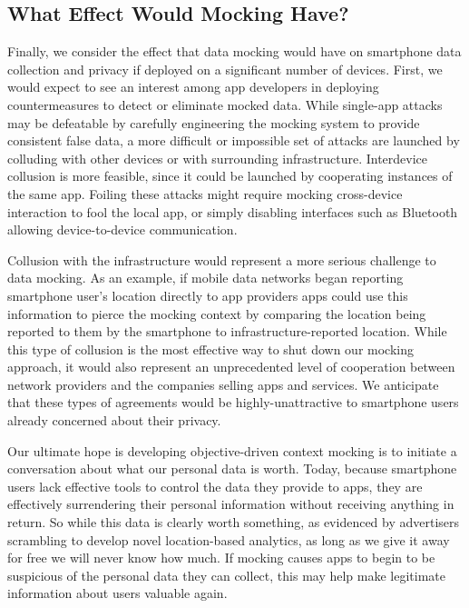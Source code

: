 \subsection{What Effect Would Mocking Have?}

Finally, we consider the effect that data mocking would have on smartphone
data collection and privacy if deployed on a significant number of devices.
First, we would expect to see an interest among app developers in deploying
countermeasures to detect or eliminate mocked data. While single-app attacks
may be defeatable by carefully engineering the mocking system to provide
consistent false data, a more difficult or impossible set of attacks are
launched by colluding with other devices or with surrounding infrastructure.
Interdevice collusion is more feasible, since it could be launched by
cooperating instances of the same app. Foiling these attacks might require
mocking cross-device interaction to fool the local app, or simply disabling
interfaces such as Bluetooth allowing device-to-device communication.

Collusion with the infrastructure would represent a more serious challenge to
data mocking. As an example, if mobile data networks began reporting
smartphone user's location directly to app providers apps could use this
information to pierce the mocking context by comparing the location being
reported to them by the smartphone to infrastructure-reported location. While
this type of collusion is the most effective way to shut down our mocking
approach, it would also represent an unprecedented level of cooperation
between network providers and the companies selling apps and services. We
anticipate that these types of agreements would be highly-unattractive to
smartphone users already concerned about their privacy.

Our ultimate hope is developing objective-driven context mocking is to
initiate a conversation about what our personal data is worth. Today, because
smartphone users lack effective tools to control the data they provide to
apps, they are effectively surrendering their personal information without
receiving anything in return. So while this data is clearly worth something,
as evidenced by advertisers scrambling to develop novel location-based
analytics, as long as we give it away for free we will never know how much.
If mocking causes apps to begin to be suspicious of the personal data they
can collect, this may help make legitimate information about users valuable
again.

